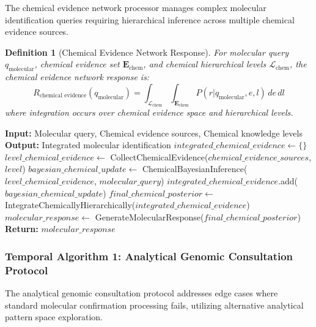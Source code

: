 \documentclass[11pt,a4paper]{article}
\newtheorem{definition}[theorem]{Definition}
\theoremstyle{remark}
\begin{document}
The chemical evidence network processor manages complex molecular identification queries requiring hierarchical inference across multiple chemical evidence sources.

\begin{definition}[Chemical Evidence Network Response]
For molecular query $q_{\text{molecular}}$, chemical evidence set $\mathbf{E}_{\text{chem}}$, and chemical hierarchical levels $\mathcal{L}_{\text{chem}}$, the chemical evidence network response is:
\begin{equation}
R_{\text{chemical evidence}}(q_{\text{molecular}}) = \int_{\mathcal{L}_{\text{chem}}} \int_{\mathbf{E}_{\text{chem}}} P(r | q_{\text{molecular}}, e, l) \, de \, dl
\end{equation}
where integration occurs over chemical evidence space and hierarchical levels.
\end{definition}

\begin{algorithm}[H]
\caption{Sachikonye's Chemical Evidence Network Algorithm 2}
\begin{algorithmic}[1]
\State \textbf{Input:} Molecular query, Chemical evidence sources, Chemical knowledge levels
\State \textbf{Output:} Integrated molecular identification
\State $integrated\_chemical\_evidence \gets \{\}$
\State $level\_chemical\_evidence \gets$ CollectChemicalEvidence($chemical\_evidence\_sources$, $level$)
\State $bayesian\_chemical\_update \gets$ ChemicalBayesianInference($level\_chemical\_evidence$, $molecular\_query$)
\State $integrated\_chemical\_evidence$.add($bayesian\_chemical\_update$)
\EndFor
\State $final\_chemical\_posterior \gets$ IntegrateChemicallyHierarchically($integrated\_chemical\_evidence$)
\State $molecular\_response \gets$ GenerateMolecularResponse($final\_chemical\_posterior$)
\State \textbf{Return:} $molecular\_response$
\EndProcedure
\end{algorithmic}
\end{algorithm}

\subsubsection{Temporal Algorithm 1: Analytical Genomic Consultation Protocol}

The analytical genomic consultation protocol addresses edge cases where standard molecular confirmation processing fails, utilizing alternative analytical pattern space exploration.
\end{document}
